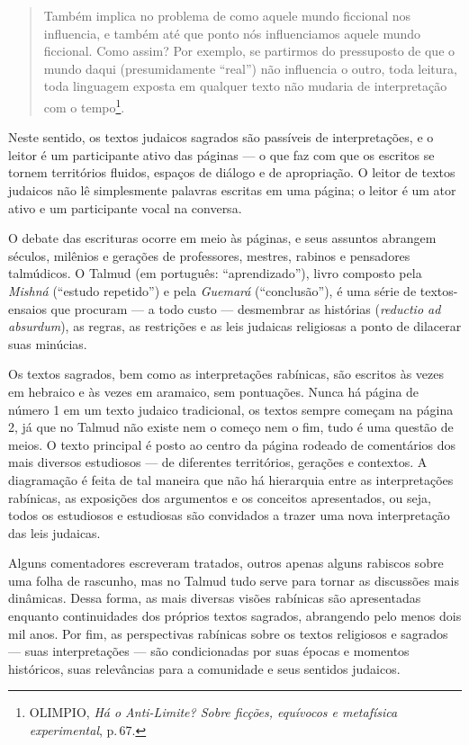 \begin{quote}
Também implica no problema de como aquele mundo ficcional nos
influencia, e também até que ponto nós influenciamos aquele mundo
ficcional. Como assim? Por exemplo, se partirmos do pressuposto de que o
mundo daqui (presumidamente ``real'') não influencia o outro, toda
leitura, toda linguagem exposta em qualquer texto não mudaria de
interpretação com o tempo\footnote{OLIMPIO, \emph{Há o Anti-Limite?
  Sobre ficções, equívocos e metafísica experimental}, p.\,67.}.
\end{quote}

Neste sentido, os textos judaicos sagrados são passíveis de
interpretações, e o leitor é um participante ativo das páginas --- o que
faz com que os escritos se tornem territórios fluidos, espaços de
diálogo e de apropriação. O leitor de textos judaicos não lê
simplesmente palavras escritas em uma página; o leitor é um ator ativo e
um participante vocal na conversa.

O debate das escrituras ocorre em meio às páginas, e seus assuntos
abrangem séculos, milênios e gerações de professores, mestres, rabinos e
pensadores talmúdicos. O Talmud (em português: ``aprendizado''),
livro composto pela \emph{Mishná} (``estudo repetido'') e pela
\emph{Guemará} (``conclusão''), é uma série de textos-ensaios que
procuram --- a todo custo --- desmembrar as histórias (\emph{reductio ad
absurdum}), as regras, as restrições e as leis judaicas religiosas a
ponto de dilacerar suas minúcias.

Os textos sagrados, bem como as interpretações rabínicas, são escritos
às vezes em hebraico e às vezes em aramaico, sem pontuações. Nunca há
página de número 1 em um texto judaico tradicional, os textos sempre
começam na página 2, já que no Talmud não existe nem o começo
nem o fim, tudo é uma questão de meios. O texto principal é posto ao
centro da página rodeado de comentários dos mais diversos estudiosos ---
de diferentes territórios, gerações e contextos. A diagramação é feita
de tal maneira que não há hierarquia entre as interpretações rabínicas,
as exposições dos argumentos e os conceitos apresentados, ou seja, todos
os estudiosos e estudiosas são convidados a trazer uma nova
interpretação das leis judaicas.

Alguns comentadores escreveram tratados, outros apenas alguns rabiscos
sobre uma folha de rascunho, mas no Talmud tudo serve para
tornar as discussões mais dinâmicas. Dessa forma, as mais diversas
visões rabínicas são apresentadas enquanto continuidades dos próprios
textos sagrados, abrangendo pelo menos dois mil anos. Por fim, as
perspectivas rabínicas sobre os textos religiosos e sagrados --- suas
interpretações --- são condicionadas por suas épocas e momentos
históricos, suas relevâncias para a comunidade e seus sentidos judaicos.

